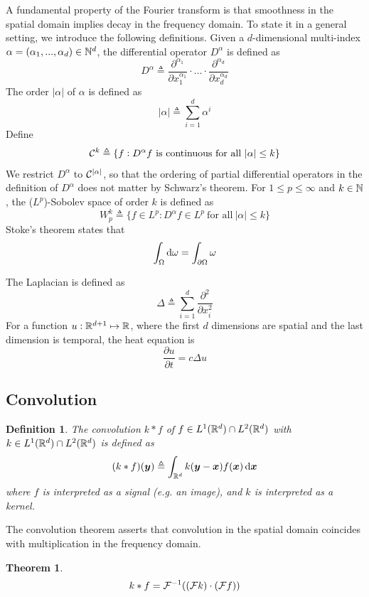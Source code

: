 \documentclass{article}
\newcommand{\pp}[2]{{\frac{\partial {#1}}{\partial {#2}}}}
\newtheorem{definition}{Definition}
\newtheorem{theorem}{Theorem}
\begin{document}
A fundamental property of the Fourier transform is that smoothness in the spatial domain implies decay in the frequency domain.
To state it in a general setting, we introduce the following definitions.
Given a $d$-dimensional multi-index $\alpha = (\alpha_1, ..., \alpha_d) \in {\mathbb N}^d$, the differential operator $D^\alpha$ is defined as
\[
D^\alpha \triangleq \frac{\partial^{\alpha_1}}{\partial x_1^{\alpha_1}} \cdot \ldots \cdot \frac{\partial^{\alpha_d}}{\partial x_d^{\alpha_d}}
\]
The order $|\alpha|$ of $\alpha$ is defined as
\[
|\alpha| \triangleq \sum_{i = 1}^d \alpha^i
\]
Define
\[
\calc^k \triangleq \{f : D^\alpha f\ \text{is continuous for all}\ |\alpha| \leq k\}
\]
We restrict $D^\alpha$ to ${\mathcal C}^{|\alpha|}$, so that the ordering of partial differential operators in the definition of $D^{\alpha}$ does not matter by Schwarz's theorem.
For $1 \leq p \leq \infty$ and $k \in {\mathbb N}$, the ($L^p$)-Sobolev space of order $k$ is defined as
\[
W_p^k \triangleq \{f \in L^p : D^\alpha f \in L^p\ \text{for all}\ |\alpha| \leq k\}
\]
Stoke's theorem states that
\[
\int_\Omega \dif \omega = \int_{\partial \Omega} \omega
\]

The Laplacian is defined as
\[
\Delta \triangleq \sum_{i = 1}^d \frac{\partial^2}{\partial x_i^2}
\]
For a function $u: {\mathbb R}^{d + 1} \mapsto {\mathbb R}$, where the first $d$ dimensions are spatial and the last dimension is temporal, the heat equation is
\[
\pp{u}{t} = c \Delta u
\]

\subsection{Convolution}

\begin{definition}
The convolution $k * f$ of $f \in L^1 ({\mathbb R}^d) \cap L^2 ({\mathbb R}^d)$ with $k \in L^1 ({\mathbb R}^d) \cap L^2 ({\mathbb R}^d)$ is defined as
\[
(k * f) (\bmy) \triangleq \int_{\bbr^d} k(\bmy - \bmx) f(\bmx) \dif \bmx
\]
where $f$ is interpreted as a signal (e.g. an image), and $k$ is interpreted as a kernel.
\end{definition}

The convolution theorem asserts that convolution in the spatial domain coincides with multiplication in the frequency domain.
\begin{theorem}
\[
k * f = {\mathcal F}^{-1} (({\mathcal F} k) \cdot ({\mathcal F} f))
\]
\end{theorem}
\end{document}
